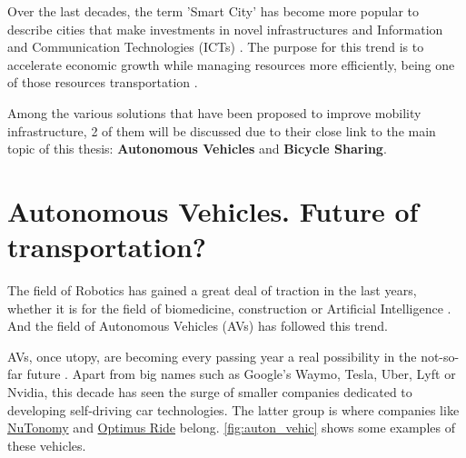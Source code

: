 Over the last decades, the term 'Smart City' has become more popular to describe cities that make investments in novel infrastructures and Information and Communication Technologies (ICTs) . The purpose for this trend is to accelerate economic growth while managing resources more efficiently, being one of those resources transportation .

Among the various solutions that have been proposed to improve mobility infrastructure, 2 of them will be discussed due to their close link to the main topic of this thesis: \textbf{Autonomous Vehicles} and \textbf{Bicycle Sharing}.

\section{Autonomous Vehicles. Future of transportation?}

The field of Robotics has gained a great deal of traction in the last years, whether it is for the field of biomedicine, construction or Artificial Intelligence . And the field of Autonomous Vehicles (AVs) has followed this trend. 

AVs, once utopy, are becoming every passing year a real possibility in the not-so-far future . Apart from big names such as Google's Waymo, Tesla, Uber, Lyft or Nvidia, this decade has seen the surge of smaller companies dedicated to developing self-driving car technologies. The latter group is where companies like \href{https://www.nutonomy.com/}{NuTonomy} and \href{https://www.optimusride.com/}{Optimus Ride} belong. \autoref{fig:auton_vehic} shows some examples of these vehicles.

